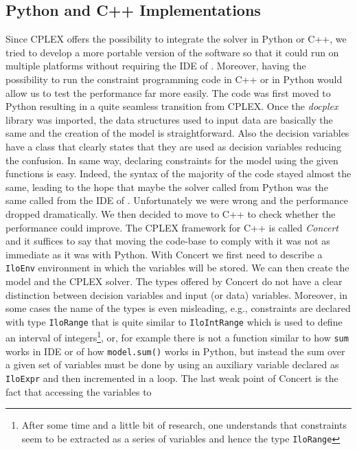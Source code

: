 \subsection{Python and C++ Implementations}
Since CPLEX offers the possibility to integrate the solver in Python or C++, we
tried to develop a more portable version of the software so that it could run
on multiple platforms without requiring the IDE of \OPL. Moreover, having the
possibility to run the constraint programming code in C++ or in Python would
allow us to test the performance far more easily. \newline
The code was first moved to Python resulting in a quite seamless transition
from CPLEX. Once the \textit{docplex} library was imported, the data structures
used to input data are basically the same and the creation of the model is 
straightforward. Also the decision variables have a class that clearly states
that they are used as decision variables reducing the confusion. In same way,
declaring constraints for the model using the given functions is easy. Indeed,
the syntax of the majority of the code stayed almost the same, leading to the
hope that maybe the solver called from Python was the same called from the IDE
of \OPL. Unfortunately we were wrong and the performance dropped dramatically.
\newline
We then decided to move to C++ to check whether the performance could improve.
The CPLEX framework for C++ is called \textit{Concert} and it suffices to say
that moving the code-base to comply with it was not as immediate as it was with
Python. With Concert we first need to describe a \texttt{IloEnv} environment
in which the variables will be stored. We can then create the model and the
CPLEX solver. The types offered by Concert do not have a clear distinction
between decision variables and input (or data) variables. Moreover, in some
cases the name of the types is even misleading, e.g., constraints are
declared with type \texttt{IloRange} that is quite similar to
\texttt{IloIntRange} which is used to define an interval of integers\footnote{
After some time and a little bit of research, one understands that constraints
seem to be extracted as a series of variables and hence the type  
\texttt{IloRange}}, or, for example there is not a function similar to how 
\texttt{sum} works in \OPL IDE or of how \texttt{model.sum()} works in Python,
but instead the sum over a given set of variables must be done by using an
auxiliary variable declared as \texttt{IloExpr} and then incremented in a loop.
The last weak point of Concert is the fact that accessing the variables to
